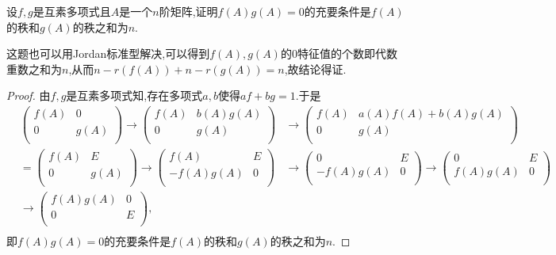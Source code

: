 \documentclass[../../main.tex]{subfiles}%
\begin{document}
\begin{example}
设\( f,g \)是互素多项式且\( A \)是一个\( n \)阶矩阵,证明\( f(A)g(A)=0 \)的充要条件是\( f(A) \)的秩和\( g(A) \)的秩之和为\( n \).
\end{example}
\begin{note}
这题也可以用Jordan标准型解决,可以得到$f(A),g(A)$的0特征值的个数即代数重数之和为$n$,从而$n-r(f(A))+n-r(g(A))=n$,故结论得证.
\end{note}
\begin{proof}

由\( f,g \)是互素多项式知,存在多项式\( a,b \)使得\( af + bg = 1 \).于是
\begin{align*}
&\left( \begin{matrix}
f(A)&		0\\
0&		g(A)\\
\end{matrix} \right) \rightarrow \left( \begin{matrix}
f(A)&		b(A)g(A)\\
0&		g(A)\\
\end{matrix} \right) &\rightarrow \left( \begin{matrix}
f(A)&		a(A)f(A)+b(A)g(A)\\
0&		g(A)\\
\end{matrix} \right)\\
&=\left( \begin{matrix}
f(A)&		E\\
0&		g(A)\\
\end{matrix} \right) \rightarrow \left( \begin{matrix}
f(A)&		E\\
-f(A)g(A)&		0\\
\end{matrix} \right) &\rightarrow \left( \begin{matrix}
0&		E\\
-f(A)g(A)&		0\\
\end{matrix} \right) \rightarrow \left( \begin{matrix}
0&		E\\
f(A)g(A)&		0\\
\end{matrix} \right)\\
&\rightarrow \left( \begin{matrix}
f(A)g(A)&		0\\
0&		E\\
\end{matrix} \right) ,\\
\end{align*}
即\( f(A)g(A)=0 \)的充要条件是\( f(A) \)的秩和\( g(A) \)的秩之和为\( n \).

\end{proof}
\end{document}
